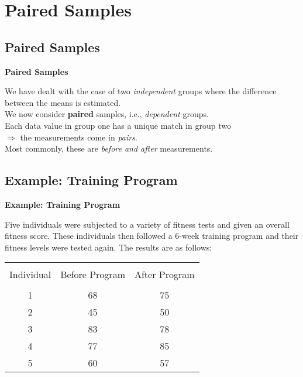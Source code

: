 \documentclass[compress]{beamer}        %
\makeatletter
\newcommand{\tcb}{\textcolor{beamer@blendedblue}}
\makeatother
\begin{document}
\section{Paired Samples}
\subsection{Paired Samples}
\begin{frame}{\bf \tcb{Paired Samples}}

We have dealt with the case of two \emph{independent} groups where the difference between the means is estimated.\\[1cm]

We now consider {\bf paired} samples, i.e., \emph{dependent} groups.\\[1cm]

Each data value in group one has a unique match in group two\\ $\Rightarrow$ the measurements come in \emph{pairs}.\\[1cm]

Most commonly, these are \emph{before and after} measurements.

\end{frame}



\subsection{Example: Training Program}
\begin{frame}{\bf \tcb{Example: Training Program}}

Five individuals were subjected to a variety of fitness tests and given an overall fitness score. These individuals then followed a 6-week training program and their fitness levels were tested again. The results are as follows:\\[0.8cm]

\begin{center}
\begin{tabular}{|c|c|c|}
\hline
&&\\[-0.4cm]
Individual & Before Program & After Program \\
\hline
&&\\[-0.4cm]
1 & 68 & 75 \\
2 & 45 & 50 \\
3 & 83 & 78 \\
4 & 77 & 85 \\
5 & 60 & 57 \\[0.1cm]
\hline
\end{tabular}
\end{center}


\end{frame}
\end{document}
